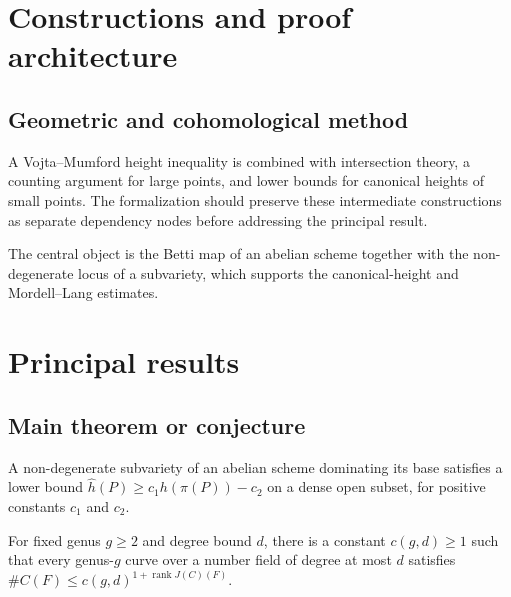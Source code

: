 \chapter{Constructions and proof architecture}
\label{chap:uniformity-mordell-lang-curves-method}

\section{Geometric and cohomological method}
\label{sec:uniformity-mordell-lang-curves-method}

A Vojta--Mumford height inequality is combined with intersection theory, a counting argument for large points, and lower bounds for canonical heights of small points. The formalization should preserve these intermediate constructions
as separate dependency nodes before addressing the principal result.

\begin{definition}
\label{uniformity-mordell-lang-curves-central-object}
The central object is the Betti map of an abelian scheme together with the non-degenerate locus of a subvariety, which supports the canonical-height and Mordell--Lang estimates.
\notready
\end{definition}

\chapter{Principal results}
\label{chap:uniformity-mordell-lang-curves-results}

\section{Main theorem or conjecture}
\label{sec:uniformity-mordell-lang-curves-results}

\begin{theorem}
\label{uniformity-mordell-lang-curves-main}
A non-degenerate subvariety of an abelian scheme dominating its base satisfies a lower bound $\widehat h(P)\geq c_1h(\pi(P))-c_2$ on a dense open subset, for positive constants $c_1$ and $c_2$.
\notready
\end{theorem}

\begin{theorem}
\label{uniformity-mordell-lang-curves-secondary}
For fixed genus $g\geq2$ and degree bound $d$, there is a constant $c(g,d)\geq1$ such that every genus-$g$ curve over a number field of degree at most $d$ satisfies $\#C(F)\leq c(g,d)^{1+\operatorname{rank}J(C)(F)}$.
\notready
\end{theorem}
